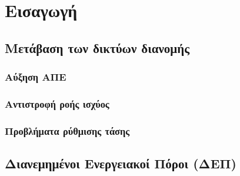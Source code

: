 \chapter{Εισαγωγή}
\label{ch:chapter1}



\section{Μετάβαση των δικτύων διανομής}
\subsection{Αύξηση ΑΠΕ}
\subsection{Αντιστροφή ροής ισχύος}
\subsection{Προβλήματα ρύθμισης τάσης}

\section{Διανεμημένοι Ενεργειακοί Πόροι (ΔΕΠ)}
